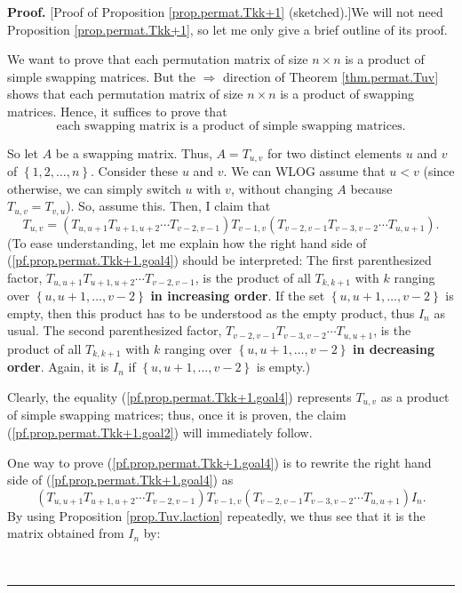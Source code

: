 \documentclass[numbers=enddot,12pt,final,onecolumn,notitlepage]{scrartcl}%
\theoremstyle{definition}
\newenvironment{proof}[1][Proof]{\noindent\textbf{#1.} }{\ \rule{0.5em}{0.5em}}
\begin{document}
\begin{proof}
[Proof of Proposition \ref{prop.permat.Tkk+1} (sketched).]We will not need
Proposition \ref{prop.permat.Tkk+1}, so let me only give a brief outline of
its proof.

We want to prove that each permutation matrix of size $n\times n$ is a product
of simple swapping matrices. But the $\Longrightarrow$ direction of Theorem
\ref{thm.permat.Tuv} shows that each permutation matrix of size $n\times n$ is
a product of swapping matrices. Hence, it suffices to prove that%
\begin{equation}
\text{each swapping matrix is a product of simple swapping matrices.}
\label{pf.prop.permat.Tkk+1.goal2}%
\end{equation}


So let $A$ be a swapping matrix. Thus, $A=T_{u,v}$ for two distinct elements
$u$ and $v$ of $\left\{  1,2,\ldots,n\right\}  $. Consider these $u$ and $v$.
We can WLOG assume that $u<v$ (since otherwise, we can simply switch $u$ with
$v$, without changing $A$ because $T_{u,v}=T_{v,u}$). So, assume this. Then, I
claim that%
\begin{equation}
T_{u,v}=\left(  T_{u,u+1}T_{u+1,u+2}\cdots T_{v-2,v-1}\right)  T_{v-1,v}%
\left(  T_{v-2,v-1}T_{v-3,v-2}\cdots T_{u,u+1}\right)  .
\label{pf.prop.permat.Tkk+1.goal4}%
\end{equation}
(To ease understanding, let me explain how the right hand side of
(\ref{pf.prop.permat.Tkk+1.goal4}) should be interpreted: The first
parenthesized factor, $T_{u,u+1}T_{u+1,u+2}\cdots T_{v-2,v-1}$, is the product
of all $T_{k,k+1}$ with $k$ ranging over $\left\{  u,u+1,\ldots,v-2\right\}  $
\textbf{in increasing order}. If the set $\left\{  u,u+1,\ldots,v-2\right\}  $
is empty, then this product has to be understood as the empty product, thus
$I_{n}$ as usual. The second parenthesized factor, $T_{v-2,v-1}T_{v-3,v-2}%
\cdots T_{u,u+1}$, is the product of all $T_{k,k+1}$ with $k$ ranging over
$\left\{  u,u+1,\ldots,v-2\right\}  $ \textbf{in decreasing order}. Again, it
is $I_{n}$ if $\left\{  u,u+1,\ldots,v-2\right\}  $ is empty.)

Clearly, the equality (\ref{pf.prop.permat.Tkk+1.goal4}) represents $T_{u,v}$
as a product of simple swapping matrices; thus, once it is proven, the claim
(\ref{pf.prop.permat.Tkk+1.goal2}) will immediately follow.

One way to prove (\ref{pf.prop.permat.Tkk+1.goal4}) is to rewrite the right
hand side of (\ref{pf.prop.permat.Tkk+1.goal4}) as%
\begin{equation}
\left(  T_{u,u+1}T_{u+1,u+2}\cdots T_{v-2,v-1}\right)  T_{v-1,v}\left(
T_{v-2,v-1}T_{v-3,v-2}\cdots T_{u,u+1}\right)  I_{n}.
\label{pf.prop.permat.Tkk+1.RHS}%
\end{equation}
By using Proposition \ref{prop.Tuv.laction} repeatedly, we thus see that it is
the matrix obtained from $I_{n}$ by:


\end{proof}
\end{document}
